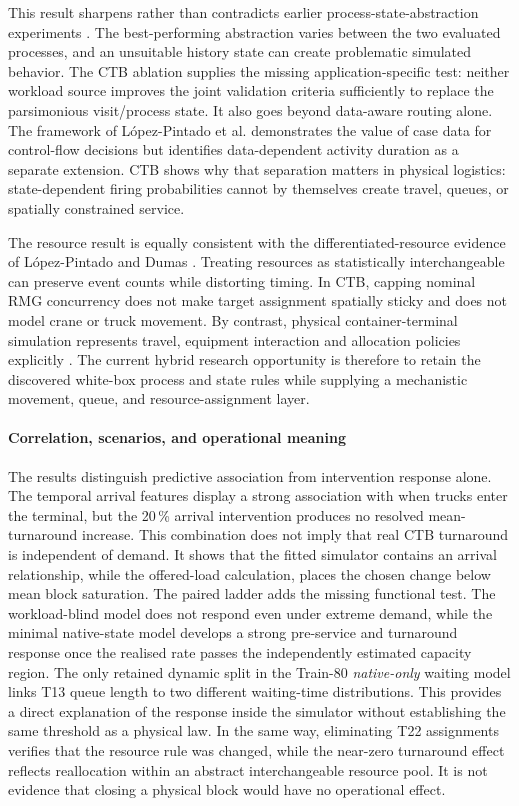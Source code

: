 This result sharpens rather than contradicts earlier process-state-abstraction
experiments \cite{Vinci2023Inf.Activ.Prob}. The best-performing abstraction
varies between the two evaluated processes, and an unsuitable history state can
create problematic simulated behavior. The CTB ablation supplies the missing
application-specific test: neither workload source improves the joint
validation criteria sufficiently to replace the parsimonious visit/process
state. It also goes beyond data-aware routing alone. The framework of
López-Pintado et al. \cite{lopez2024} demonstrates the value of case data for
control-flow decisions but identifies data-dependent activity duration as a
separate extension. CTB shows why that separation matters in physical
logistics: state-dependent firing probabilities cannot by themselves create
travel, queues, or spatially constrained service.

The resource result is equally consistent with the differentiated-resource
evidence of López-Pintado and Dumas \cite{BPSdifferentiatedResources2022}.
Treating resources as statistically interchangeable can preserve event counts
while distorting timing. In CTB, capping nominal RMG concurrency does not make
target assignment spatially sticky and does not model crane or truck movement.
By contrast, physical container-terminal simulation represents travel,
equipment interaction and allocation policies explicitly
\cite{Kastner2021}. The current hybrid research opportunity is therefore to
retain the discovered white-box process and state rules while supplying a
mechanistic movement, queue, and resource-assignment layer.

\paragraph{Correlation, scenarios, and operational meaning}
The results distinguish predictive association from intervention response alone. The temporal arrival features display a strong association with when
trucks enter the terminal, but the 20\,\% arrival intervention produces no
resolved mean-turnaround increase. This combination does not imply that real
CTB turnaround is independent of demand. It shows that the fitted simulator
contains an arrival relationship, while the offered-load calculation, places
the chosen change below mean block saturation. The paired ladder adds the
missing functional test. The workload-blind model does not respond even under
extreme demand, while the minimal native-state model develops a strong
pre-service and turnaround response once the realised rate passes the
independently estimated capacity region. The only retained dynamic split in
the Train-80 \textit{native-only} waiting model links T13 queue length to two
different waiting-time
distributions. This provides a direct explanation of the response inside the
simulator without establishing the same threshold as a physical law. In the
same way, eliminating T22
assignments verifies that the resource rule was
changed, while the near-zero turnaround effect reflects reallocation within an
abstract interchangeable resource pool. It is not evidence that closing a
physical block would have no operational effect.

